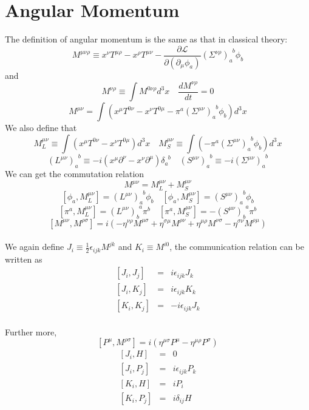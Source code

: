 \section{Angular Momentum}
\noindent
The definition of angular momentum is the same as that in classical theory:
\[M^{\mu \nu \rho} \equiv x^{\nu}T^{\mu \rho} - x^{\rho} T^{\mu \nu} - \frac{\partial \mathcal{L}}{\partial (\partial_{\mu}\phi_a)}(\Sigma^{\nu \rho})_{a}^{\phantom{a}b}\phi_b\]
and 
\[M^{\nu \rho} \equiv \int M^{0 \nu \rho} d^3 x \quad \frac{dM^{\nu \rho}}{dt} = 0\]
\[M^{\mu \nu} = \int (x^{\mu}T^{0\nu}-x^{\nu}T^{0\mu}-\pi^a(\Sigma^{\mu \nu})_{a}^{\phantom{a}b}\phi_b) d^3 x\]
We also define that
\[M_{L}^{\mu \nu} \equiv \int (x^{\mu}T^{0\nu}-x^{\nu}T^{0\mu}) d^3 x \quad M_S^{\mu \nu} \equiv\int (-\pi^a(\Sigma^{\mu \nu})_{a}^{\phantom{a}b}\phi_b) d^3 x\]
\[(L^{\mu \nu})_a^{\phantom{a}b} \equiv -i(x^{\mu}\partial^{\nu}-x^{\nu}\partial^{\mu})\delta_a^{\phantom{a}b} \quad (S^{\mu \nu})_a^{\phantom{a}b} \equiv -i(\Sigma^{\mu \nu})_a^{\phantom{a}b}\]
We can get the commutation relation
\[M^{\mu \nu} = M_L^{\mu \nu} + M_S^{\mu \nu}\]
\[[\phi_a,M_L^{\mu \nu}] = (L^{\mu \nu})_a^{\phantom{a}b} \phi_b \quad [\phi_a,M_S^{\mu \nu}] = (S^{\mu \nu})_a^{\phantom{a}b} \phi_b\]
\[[\pi^a,M_L^{\mu \nu}] = (L^{\mu \nu})_b^{\phantom{b}a}\pi^{b}  \quad [\pi^a,M_S^{\mu \nu}] = - (S^{\mu \nu})_b^{\phantom{b}a} \pi^b \]
\[[M^{\mu \nu},M^{\rho \sigma}] = i(-\eta^{\nu \rho}M^{\mu \sigma} + \eta^{\sigma \mu}M^{\rho \nu} + \eta^{\mu \rho}M^{\nu \sigma} - \eta^{\sigma \nu}M^{\rho \mu})\] \\
We again define $J_i \equiv \frac{1}{2} \epsilon_{ijk} M^{jk}$ and $K_i \equiv M^{i0}$, the communication relation can be written as
\begin{eqnarray}
\left[J_i,J_j\right] &=& i\epsilon_{ijk}J_k \nonumber \\
\left[J_i,K_j\right] &=& i\epsilon_{ijk}K_k \nonumber \\
\left[K_i,K_j\right] &=& -i\epsilon_{ijk}J_k \nonumber
\end{eqnarray} \\
Further more,
\[[P^{\mu},M^{\rho \sigma}] = i(\eta^{\mu \sigma}P^{\mu} - \eta^{\mu \rho}P^{\sigma})\]
\begin{eqnarray}
\left[J_i,H\right] &=& 0 \nonumber \\
\left[J_i,P_j\right] &=& i\epsilon_{ijk}P_k \nonumber \\
\left[K_i,H\right] &=& iP_i \nonumber \\
\left[K_i,P_j\right] &=& i\delta_{ij}H \nonumber
\end{eqnarray}
